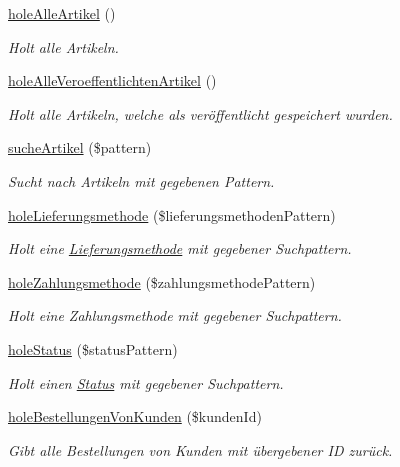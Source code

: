 \begin{DoxyCompactItemize}
\hyperlink{classDatabaseModel_ada4e7c182aa3b00d684965e8392d02ee}{hole\-Alle\-Artikel} ()
\begin{DoxyCompactList}\small\item\em \-Holt alle \-Artikeln. \end{DoxyCompactList}\item 
\hyperlink{classDatabaseModel_a000ed757760b588d6998ef5c180df34f}{hole\-Alle\-Veroeffentlichten\-Artikel} ()
\begin{DoxyCompactList}\small\item\em \-Holt alle \-Artikeln, welche als veröffentlicht gespeichert wurden. \end{DoxyCompactList}\item 
\hyperlink{classDatabaseModel_ac2dc51ab0cc99eef20d02b1945ef740b}{suche\-Artikel} (\$pattern)
\begin{DoxyCompactList}\small\item\em \-Sucht nach \-Artikeln mit gegebenen \-Pattern. \end{DoxyCompactList}\item 
\hyperlink{classDatabaseModel_a233a6064cc83947926f5534f3b2ad145}{hole\-Lieferungsmethode} (\$lieferungsmethoden\-Pattern)
\begin{DoxyCompactList}\small\item\em \-Holt eine \hyperlink{classLieferungsmethode}{\-Lieferungsmethode} mit gegebener \-Suchpattern. \end{DoxyCompactList}\item 
\hyperlink{classDatabaseModel_a7c7ac6b9730d97d09c67f01e013d14d6}{hole\-Zahlungsmethode} (\$zahlungsmethode\-Pattern)
\begin{DoxyCompactList}\small\item\em \-Holt eine \-Zahlungsmethode mit gegebener \-Suchpattern. \end{DoxyCompactList}\item 
\hyperlink{classDatabaseModel_acbbf506e57f6001432bcca18cf2c39f7}{hole\-Status} (\$status\-Pattern)
\begin{DoxyCompactList}\small\item\em \-Holt einen \hyperlink{classStatus}{\-Status} mit gegebener \-Suchpattern. \end{DoxyCompactList}\item 
\hyperlink{classDatabaseModel_a5cf2e044bcb65f00b33eb238edc80931}{hole\-Bestellungen\-Von\-Kunden} (\$kunden\-Id)
\begin{DoxyCompactList}\small\item\em \-Gibt alle \-Bestellungen von \-Kunden mit übergebener \-I\-D zurück. \end{DoxyCompactList}\item 

\end{DoxyCompactItemize}
